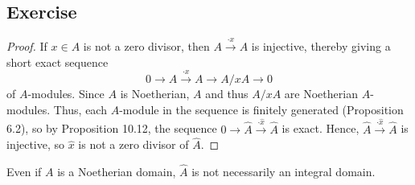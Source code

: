 \subsection{Exercise}\label{10.4}

\begin{proof}
If $x \in A$ is not a zero divisor, then $A \xrightarrow{\cdot x} A$ is injective, thereby giving a short exact sequence
$$0 \to A \xrightarrow{\cdot x} A \to A/xA \to 0$$
of $A$-modules. Since $A$ is Noetherian, $A$ and thus $A/xA$ are Noetherian $A$-modules. Thus, each $A$-module in the sequence
is finitely generated (Proposition 6.2), so by Proposition 10.12, the sequence $0 \to \hat A \xrightarrow{\cdot \hat x} \hat A$
is exact. Hence, $\hat A \xrightarrow{\cdot \hat x} \hat A$ is injective, so $\hat x$ is not a zero divisor of $\hat A$.
\end{proof}

Even if $A$ is a Noetherian domain, $\hat A$ is not necessarily an integral domain.

